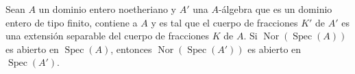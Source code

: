 \begin{lemma}[6.13.7.1]
\label{IV.2.s6.13.7.1-fr}
Sean $A$ un dominio entero noetheriano y $A'$ una $A$-álgebra que es
un dominio entero de tipo finito, contiene a $A$ y es tal que el
cuerpo de fracciones $K'$ de $A'$ es una extensión separable del cuerpo
de fracciones $K$ de $A$. Si
$\operatorname{Nor}(\operatorname{Spec}(A))$ es abierto en
$\operatorname{Spec}(A)$, entonces
$\operatorname{Nor}(\operatorname{Spec}(A'))$ es abierto en
$\operatorname{Spec}(A')$.
\end{lemma}
